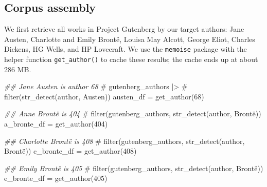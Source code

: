 \documentclass[
]{article}
\newenvironment{Shaded}{\begin{snugshade}}{\end{snugshade}}
\newcommand{\CommentTok}[1]{\textcolor[rgb]{0.37,0.37,0.37}{#1}}
\newcommand{\DecValTok}[1]{\textcolor[rgb]{0.68,0.00,0.00}{#1}}
\newcommand{\DocumentationTok}[1]{\textcolor[rgb]{0.37,0.37,0.37}{\textit{#1}}}
\newcommand{\FunctionTok}[1]{\textcolor[rgb]{0.28,0.35,0.67}{#1}}
\newcommand{\NormalTok}[1]{\textcolor[rgb]{0.00,0.23,0.31}{#1}}
\newcommand{\OtherTok}[1]{\textcolor[rgb]{0.00,0.23,0.31}{#1}}
\begin{document}
\hypertarget{corpus-assembly}{%
\subsection{Corpus assembly}\label{corpus-assembly}}

We first retrieve all works in Project Gutenberg by our target authors:
Jane Austen, Charlotte and Emily Brontë, Louisa May Alcott, George
Eliot, Charles Dickens, HG Wells, and HP Lovecraft. We use the
\texttt{memoise} package with the helper function \texttt{get\_author()}
to cache these results; the cache ends up at about 286 MB.

\begin{Shaded}
\begin{Highlighting}[]
\DocumentationTok{\#\# Jane Austen is author 68}
\CommentTok{\# gutenberg\_authors |\textgreater{} }
\CommentTok{\#     filter(str\_detect(author, \textquotesingle{}Austen\textquotesingle{}))}
\NormalTok{austen\_df }\OtherTok{=} \FunctionTok{get\_author}\NormalTok{(}\DecValTok{68}\NormalTok{)}
\end{Highlighting}
\end{Shaded}

\begin{Shaded}
\begin{Highlighting}[]
\DocumentationTok{\#\# Anne Brontë is 404}
\CommentTok{\# filter(gutenberg\_authors, str\_detect(author, \textquotesingle{}Brontë\textquotesingle{}))}
\NormalTok{a\_bronte\_df }\OtherTok{=} \FunctionTok{get\_author}\NormalTok{(}\DecValTok{404}\NormalTok{)}
\end{Highlighting}
\end{Shaded}

\begin{Shaded}
\begin{Highlighting}[]
\DocumentationTok{\#\# Charlotte Brontë is 408}
\CommentTok{\# filter(gutenberg\_authors, str\_detect(author, \textquotesingle{}Brontë\textquotesingle{}))}
\NormalTok{c\_bronte\_df }\OtherTok{=} \FunctionTok{get\_author}\NormalTok{(}\DecValTok{408}\NormalTok{)}
\end{Highlighting}
\end{Shaded}

\begin{Shaded}
\begin{Highlighting}[]
\DocumentationTok{\#\# Emily Brontë is 405}
\CommentTok{\# filter(gutenberg\_authors, str\_detect(author, \textquotesingle{}Brontë\textquotesingle{}))}
\NormalTok{e\_bronte\_df }\OtherTok{=} \FunctionTok{get\_author}\NormalTok{(}\DecValTok{405}\NormalTok{)}
\end{Highlighting}
\end{Shaded}
\end{document}

